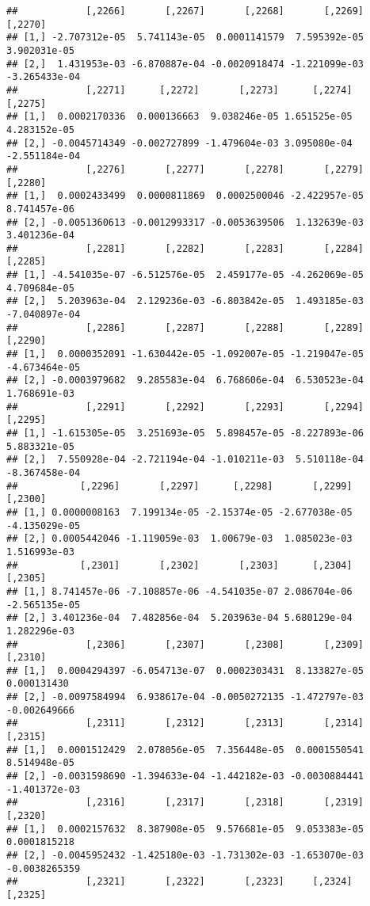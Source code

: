 \documentclass[
]{article}
\begin{document}
\begin{verbatim}
##            [,2266]       [,2267]       [,2268]       [,2269]       [,2270]
## [1,] -2.707312e-05  5.741143e-05  0.0001141579  7.595392e-05  3.902031e-05
## [2,]  1.431953e-03 -6.870887e-04 -0.0020918474 -1.221099e-03 -3.265433e-04
##            [,2271]      [,2272]       [,2273]      [,2274]       [,2275]
## [1,]  0.0002170336  0.000136663  9.038246e-05 1.651525e-05  4.283152e-05
## [2,] -0.0045714349 -0.002727899 -1.479604e-03 3.095080e-04 -2.551184e-04
##            [,2276]       [,2277]       [,2278]       [,2279]      [,2280]
## [1,]  0.0002433499  0.0000811869  0.0002500046 -2.422957e-05 8.741457e-06
## [2,] -0.0051360613 -0.0012993317 -0.0053639506  1.132639e-03 3.401236e-04
##            [,2281]       [,2282]       [,2283]       [,2284]       [,2285]
## [1,] -4.541035e-07 -6.512576e-05  2.459177e-05 -4.262069e-05  4.709684e-05
## [2,]  5.203963e-04  2.129236e-03 -6.803842e-05  1.493185e-03 -7.040897e-04
##            [,2286]       [,2287]       [,2288]       [,2289]       [,2290]
## [1,]  0.0000352091 -1.630442e-05 -1.092007e-05 -1.219047e-05 -4.673464e-05
## [2,] -0.0003979682  9.285583e-04  6.768606e-04  6.530523e-04  1.768691e-03
##            [,2291]       [,2292]       [,2293]       [,2294]       [,2295]
## [1,] -1.615305e-05  3.251693e-05  5.898457e-05 -8.227893e-06  5.883321e-05
## [2,]  7.550928e-04 -2.721194e-04 -1.010211e-03  5.510118e-04 -8.367458e-04
##           [,2296]       [,2297]      [,2298]       [,2299]       [,2300]
## [1,] 0.0000008163  7.199134e-05 -2.15374e-05 -2.677038e-05 -4.135029e-05
## [2,] 0.0005442046 -1.119059e-03  1.00679e-03  1.085023e-03  1.516993e-03
##           [,2301]       [,2302]       [,2303]      [,2304]       [,2305]
## [1,] 8.741457e-06 -7.108857e-06 -4.541035e-07 2.086704e-06 -2.565135e-05
## [2,] 3.401236e-04  7.482856e-04  5.203963e-04 5.680129e-04  1.282296e-03
##            [,2306]       [,2307]       [,2308]       [,2309]      [,2310]
## [1,]  0.0004294397 -6.054713e-07  0.0002303431  8.133827e-05  0.000131430
## [2,] -0.0097584994  6.938617e-04 -0.0050272135 -1.472797e-03 -0.002649666
##            [,2311]       [,2312]       [,2313]       [,2314]       [,2315]
## [1,]  0.0001512429  2.078056e-05  7.356448e-05  0.0001550541  8.514948e-05
## [2,] -0.0031598690 -1.394633e-04 -1.442182e-03 -0.0030884441 -1.401372e-03
##            [,2316]       [,2317]       [,2318]       [,2319]       [,2320]
## [1,]  0.0002157632  8.387908e-05  9.576681e-05  9.053383e-05  0.0001815218
## [2,] -0.0045952432 -1.425180e-03 -1.731302e-03 -1.653070e-03 -0.0038265359
##            [,2321]       [,2322]       [,2323]     [,2324]       [,2325]

\end{verbatim}
\end{document}
